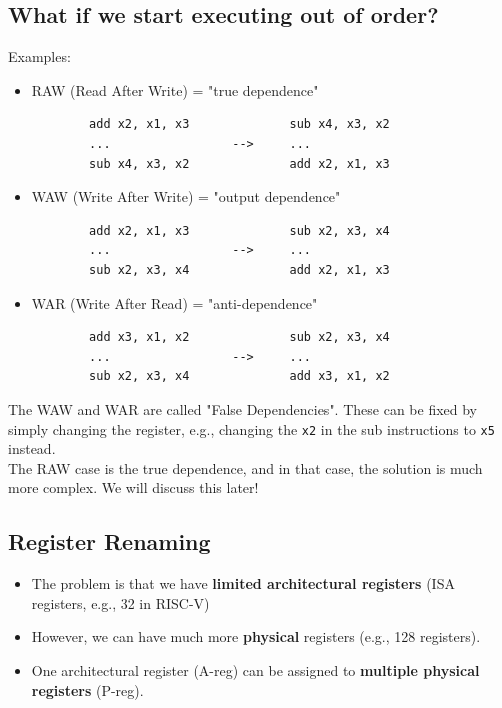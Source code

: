 \documentclass[10pt]{article}
\begin{document}
\subsection{What if we start executing out of order?}
Examples:
\begin{itemize}
    \item RAW (Read After Write) = "true dependence"
    \begin{verbatim}
        add x2, x1, x3              sub x4, x3, x2    
        ...                 -->     ...
        sub x4, x3, x2              add x2, x1, x3
    \end{verbatim}
    \item WAW (Write After Write) = "output dependence"
    \begin{verbatim}
        add x2, x1, x3              sub x2, x3, x4
        ...                 -->     ...
        sub x2, x3, x4              add x2, x1, x3
    \end{verbatim}
    \item WAR (Write After Read) = "anti-dependence"
    \begin{verbatim}
        add x3, x1, x2              sub x2, x3, x4
        ...                 -->     ...
        sub x2, x3, x4              add x3, x1, x2
    \end{verbatim}
\end{itemize}
The WAW and WAR are called "False Dependencies".  These can be fixed by simply changing the register, e.g., changing the \texttt{x2} in the sub instructions to \texttt{x5} instead.\\
The RAW case is the true dependence, and in that case, the solution is much more complex.  We will discuss this later!

\subsection*{Register Renaming}
\begin{itemize}
    \item The problem is that we have \textbf{limited architectural registers} (ISA registers, e.g., 32 in RISC-V)
    \item However, we can have much more \textbf{physical} registers (e.g., 128 registers).
    \item One architectural register (A-reg) can be assigned to \textbf{multiple physical registers} (P-reg).
\end{itemize}
\end{document}
